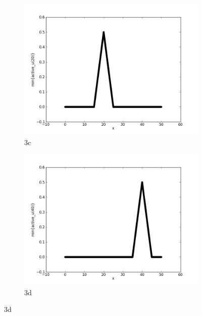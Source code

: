\documentclass{report}
\begin{document}
\begin{figure}[ht]
\begin{subfigure}[b]{0.5\textwidth}
                \includegraphics[width=\textwidth]{ex3c.png}
                \caption{3c}
	\end{subfigure}
	\begin{subfigure}[b]{0.5\textwidth}
                \centering
                \includegraphics[width=\textwidth]{ex3d.png}
                \caption{3d}
	\end{subfigure}
\end{figure}


\newpage
\end{document}
